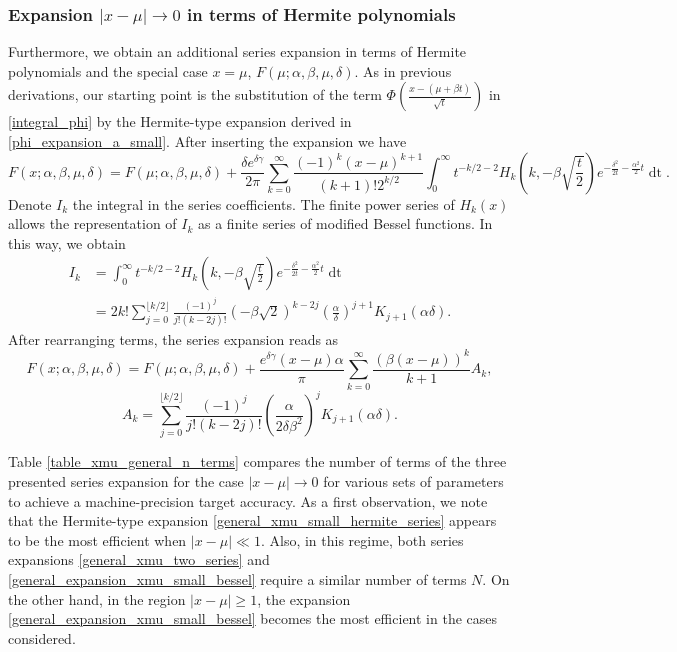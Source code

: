 \documentclass[10pt,a4paper,oneside]{article}
\numberwithin{equation}{section}
\begin{document}
\subsubsection{Expansion $|x-\mu| \to 0$ in terms of Hermite polynomials}
Furthermore, we obtain an additional series expansion in terms of Hermite polynomials and the special case $x=\mu$, $F(\mu; \alpha, \beta, \mu, \delta)$. As in previous derivations, our starting point is the substitution of the term $\Phi\left(\frac{x - (\mu +\beta t)}{\sqrt{t}}\right)$ in \eqref{integral_phi}
by the Hermite-type expansion derived in \eqref{phi_expansion_a_small}. After inserting the expansion we have
\begin{equation}
F(x; \alpha, \beta, \mu, \delta) = F(\mu; \alpha, \beta, \mu, \delta) + \frac{\delta e^{\delta \gamma}}{2\pi} \sum_{k=0}^{\infty}\frac{(-1)^k (x-\mu)^{k+1}}{(k + 1)! 2^{k/2}}\int_0^{\infty} t^{-k/2 - 2} H_k\left(k, -\beta\sqrt{\frac{t}{2}}\right) e^{-\frac{\delta^2}{2t} - \frac{\alpha^2}{2}t} \mathop{dt}.
\end{equation}
Denote $I_k$ the integral in the series coefficients. The finite power series of $H_k(x)$ \cite[\S 18.5.13]{NIST:DLMF} allows the representation of $I_k$ as a finite series of modified Bessel functions. In this way, we obtain
\begin{align}
I_k  &= \int_0^{\infty} t^{-k/2 - 2} H_k\left(k, -\beta\sqrt{\frac{t}{2}}\right) e^{-\frac{\delta^2}{2t} - \frac{\alpha^2}{2}t} \mathop{dt}\\
&= 2k! \sum_{j=0}^{\lfloor k/2 \rfloor} \frac{(-1)^j}{j!(k - 2j)!} (-\beta\sqrt{2})^{k - 2j} \left(\frac{\alpha}{\delta}\right)^{j+1} K_{j+1}(\alpha \delta).
\end{align}
After rearranging terms, the series expansion reads as
\begin{equation}\label{general_xmu_small_hermite_series}
F(x; \alpha, \beta, \mu, \delta) = F(\mu; \alpha, \beta, \mu, \delta) + \frac{e^{\delta \gamma} (x-\mu) \alpha}{\pi} \sum_{k=0}^{\infty} \frac{(\beta(x-\mu))^k}{k+1}A_k,
\end{equation}
\begin{equation}
A_k = \sum_{j=0}^{\lfloor k/2 \rfloor} \frac{(-1)^j}{j!(k - 2j)!} \left(\frac{\alpha}{2\delta \beta^2}\right)^j K_{j+1}(\alpha \delta).
\end{equation}

Table \ref{table_xmu_general_n_terms} compares the number of terms of the three presented series expansion for the case $|x-\mu| \to 0$ for various sets of parameters to achieve a machine-precision target accuracy. As a first observation, we note that the Hermite-type expansion \eqref{general_xmu_small_hermite_series} appears to be the most efficient when $|x-\mu| \ll 1$. Also, in this regime, both series expansions \eqref{general_xmu_two_series} and \eqref{general_expansion_xmu_small_bessel} require a similar number of terms $N$. On the other hand, in the region $|x-\mu| \ge 1$, the expansion \eqref{general_expansion_xmu_small_bessel} becomes the most efficient in the cases considered. 
\end{document}
